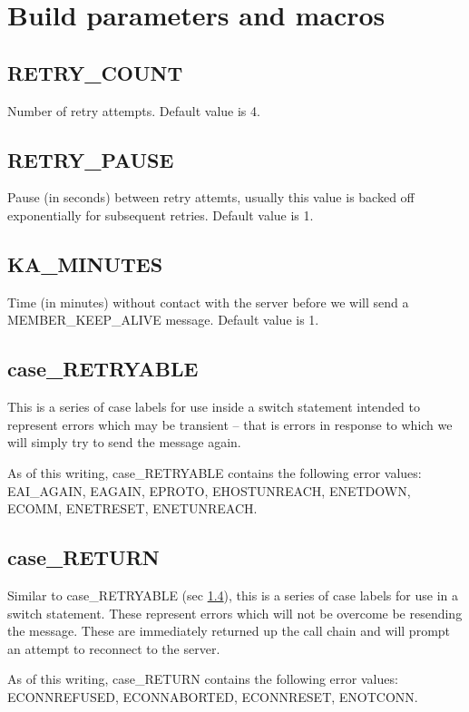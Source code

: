 \documentclass{article}
\begin{document}
\section{Build parameters and macros}
\label{sec:build}
\subsection{RETRY\_COUNT}
Number of retry attempts. Default value is 4.
\subsection{RETRY\_PAUSE}
Pause (in seconds) between retry attemts, usually this value is backed off
exponentially for subsequent retries. Default value is 1.
\subsection{KA\_MINUTES}
Time (in minutes) without contact with the server before we will send a
MEMBER\_KEEP\_ALIVE message. Default value is 1.
\subsection{case\_RETRYABLE}
\label{def:case}
This is a series of case labels for use inside a switch statement intended
to represent errors which may be transient -- that is errors in response to
which we will simply try to send the message again.

As of this writing, case\_RETRYABLE contains the following error values:
EAI\_AGAIN, EAGAIN, EPROTO, EHOSTUNREACH, ENETDOWN, ECOMM, ENETRESET,
ENETUNREACH.
\subsection{case\_RETURN}
Similar to case\_RETRYABLE (sec \ref{def:case}), this is a series of case
labels for use in a switch statement. These represent errors which will not
be overcome be resending the message. These are immediately returned up the
call chain and will prompt an attempt to reconnect to the server.

As of this writing, case\_RETURN contains the following error values:
ECONNREFUSED, ECONNABORTED, ECONNRESET, ENOTCONN.
\end{document}
